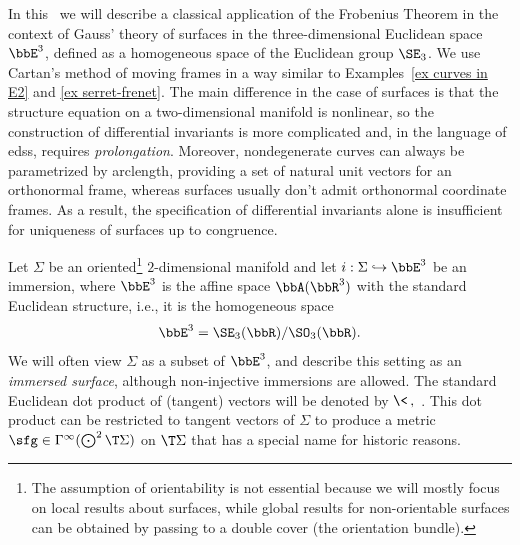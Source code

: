 In this \sect\ we will describe a classical application of the Frobenius Theorem in the context of Gauss' theory of surfaces in the three-dimensional Euclidean space $\bbE^3$, defined as a homogeneous space of the Euclidean group $\SE_3$. We use Cartan's method of moving frames in a way similar to Examples~\ref{ex curves in E2} and \ref{ex serret-frenet}. The main difference in the case of surfaces is that the structure equation on a two-dimensional manifold is nonlinear, so the construction of differential invariants is more complicated and, in the language of \glspl{eds}, requires \emph{prolongation}. Moreover, nondegenerate curves can always be parametrized by arclength, providing a set of natural unit vectors for an orthonormal frame, whereas surfaces usually don't admit orthonormal coordinate frames. As a result, the specification of differential invariants alone is insufficient for uniqueness of surfaces up to congruence.


Let $\Sigma$ be an oriented\footnote{The assumption of orientability is not essential because we will mostly focus on local results about surfaces, while global results for non-orientable surfaces can be obtained by passing to a double cover (the orientation bundle).} $2$-dimensional manifold and let $i:\Sigma\hookrightarrow \bbE^3$ be an immersion, where $\bbE^3$ is the affine space $\bbA(\bbR^3)$ with the standard Euclidean structure, i.e., it is the homogeneous space 
\[\bbE^3=\SE_3(\bbR)\slash \SO_3(\bbR).\]
We will often view $\Sigma$ as a subset of $\bbE^3$, and describe this setting as an \emph{immersed surface}, although non-injective immersions are allowed. The standard Euclidean dot product of (tangent) vectors will be denoted by $\<\,,\,\>$. This dot product can be restricted to tangent vectors of $\Sigma$ to produce a metric $\sfg\in\Gamma^\infty(\bigodot^2\T\Sigma)$ on $\T\Sigma$ that has a special name for historic reasons.

